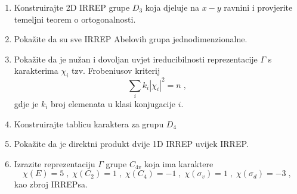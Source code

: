 \begin{enumerate}[label=\arabic{chapter}.\arabic*.]

\item Konstruirajte 2D IRREP grupe $D_3$ koja djeluje na $x-y$ ravnini
i provjerite temeljni teorem o ortogonalnosti.

\item Pokažite da su sve IRREP Abelovih grupa jednodimenzionalne.

\item Pokažite da je nužan i dovoljan uvjet ireducibilnosti reprezentacije
 $\Gamma$ s karakterima $\chi_i$ tzv. Frobeniusov kriterij
\begin{displaymath}
    \sum_i k_i |\chi_i|^2 = n  \;,
\end{displaymath}
gdje je $k_i$ broj elemenata u klasi konjugacije $i$.

\item Konstruirajte tablicu karaktera za grupu $D_4$

\item Pokažite da je direktni produkt dvije 1D IRREP uvijek IRREP.

\item Izrazite reprezentaciju $\Gamma$ grupe $C_{4v}$ koja ima
karaktere
\begin{displaymath}
  \chi(E)=5\;,\; \chi(C_2)=1\;,\; \chi(C_4)=-1\;,\;
  \chi(\sigma_v)=1\;,\; \chi(\sigma_d)=-3\;,
\end{displaymath}
kao zbroj IRREPsa.
\end{enumerate}
